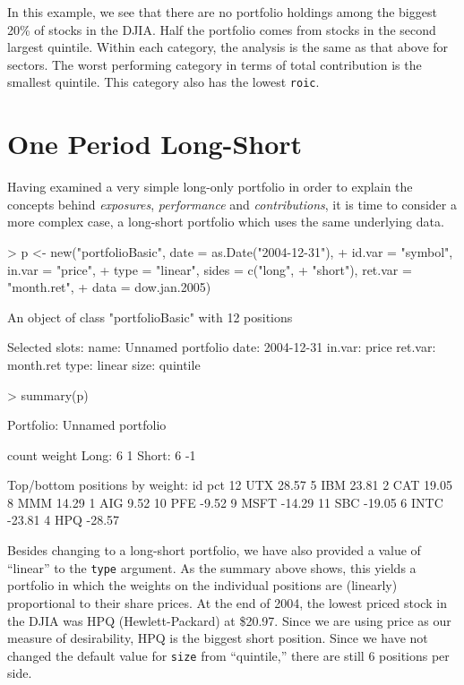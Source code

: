 \documentclass[a4paper]{report}
\begin{document}
\begin{article}
In this example, we see that there are no portfolio holdings among the
biggest 20\% of stocks in the DJIA. Half the portfolio comes from
stocks in the second largest quintile. Within each category, the
analysis is the same as that above for sectors. The worst performing
category in terms of total contribution is the smallest quintile.
This category also has the lowest \texttt{roic}.



\section*{One Period Long-Short}

Having examined a very simple long-only portfolio in order to explain
the concepts behind \emph{exposures}, \emph{performance} and
\emph{contributions}, it is time to consider a more complex case, a
long-short portfolio which uses the same underlying data.


\begin{Schunk}
\begin{Sinput}
> p <- new("portfolioBasic", date = as.Date("2004-12-31"), 
+     id.var = "symbol", in.var = "price", 
+     type = "linear", sides = c("long", 
+         "short"), ret.var = "month.ret", 
+     data = dow.jan.2005)
\end{Sinput}
\begin{Soutput}
An object of class "portfolioBasic" with 12 positions

Selected slots:
name: Unnamed portfolio
date: 2004-12-31
in.var: price
ret.var: month.ret
type: linear
size: quintile
\end{Soutput}
\begin{Sinput}
> summary(p)
\end{Sinput}
\begin{Soutput}
Portfolio: Unnamed portfolio

        count       weight
Long:       6            1 
Short:      6           -1 

Top/bottom positions by weight:
     id    pct
12  UTX  28.57
5   IBM  23.81
2   CAT  19.05
8   MMM  14.29
1   AIG   9.52
10  PFE  -9.52
9  MSFT -14.29
11  SBC -19.05
6  INTC -23.81
4   HPQ -28.57
\end{Soutput}
\end{Schunk}

Besides changing to a long-short portfolio, we have also provided a
value of ``linear'' to the \texttt{type} argument. As the summary
above shows, this yields a portfolio in which the weights on the
individual positions are (linearly) proportional to their share
prices. At the end of 2004, the lowest priced stock in the DJIA was
HPQ (Hewlett-Packard) at \$20.97. Since we are using price as our
measure of desirability, HPQ is the biggest short position. Since we
have not changed the default value for \texttt{size} from
``quintile,'' there are still 6 positions per side.


\end{article}
\end{document}

